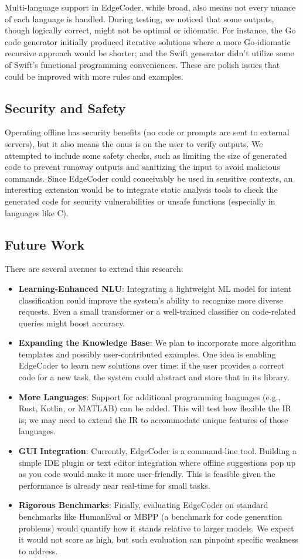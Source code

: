\documentclass[12pt]{article}
\begin{document}
Multi-language support in EdgeCoder, while broad, also means not every nuance of each language is handled. During testing, we noticed that some outputs, though logically correct, might not be optimal or idiomatic. For instance, the Go code generator initially produced iterative solutions where a more Go-idiomatic recursive approach would be shorter; and the Swift generator didn’t utilize some of Swift’s functional programming conveniences. These are polish issues that could be improved with more rules and examples.

\subsection{Security and Safety}
Operating offline has security benefits (no code or prompts are sent to external servers), but it also means the onus is on the user to verify outputs. We attempted to include some safety checks, such as limiting the size of generated code to prevent runaway outputs and sanitizing the input to avoid malicious commands. Since EdgeCoder could conceivably be used in sensitive contexts, an interesting extension would be to integrate static analysis tools to check the generated code for security vulnerabilities or unsafe functions (especially in languages like C).

\subsection{Future Work}
There are several avenues to extend this research:
\begin{itemize}
    \item \textbf{Learning-Enhanced NLU}: Integrating a lightweight ML model for intent classification could improve the system’s ability to recognize more diverse requests. Even a small transformer or a well-trained classifier on code-related queries might boost accuracy.
    \item \textbf{Expanding the Knowledge Base}: We plan to incorporate more algorithm templates and possibly user-contributed examples. One idea is enabling EdgeCoder to learn new solutions over time: if the user provides a correct code for a new task, the system could abstract and store that in its library.
    \item \textbf{More Languages}: Support for additional programming languages (e.g., Rust, Kotlin, or MATLAB) can be added. This will test how flexible the IR is; we may need to extend the IR to accommodate unique features of those languages.
    \item \textbf{GUI Integration}: Currently, EdgeCoder is a command-line tool. Building a simple IDE plugin or text editor integration where offline suggestions pop up as you code would make it more user-friendly. This is feasible given the performance is already near real-time for small tasks.
    \item \textbf{Rigorous Benchmarks}: Finally, evaluating EdgeCoder on standard benchmarks like HumanEval or MBPP (a benchmark for code generation problems) would quantify how it stands relative to larger models. We expect it would not score as high, but such evaluation can pinpoint specific weakness to address.
\end{itemize}
\end{document}
